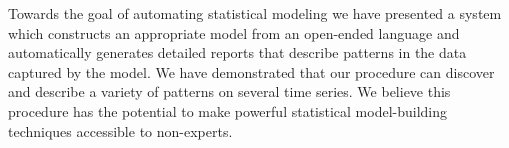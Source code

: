 Towards the goal of automating statistical modeling we have presented a system which constructs an appropriate model from an open-ended language and automatically generates detailed reports that describe patterns in the data captured by the model.
We have demonstrated that our procedure can discover and describe a variety of patterns on several time series.
We believe this procedure has the potential to make powerful statistical model-building techniques accessible to non-experts.





\outbpdocument{


}


